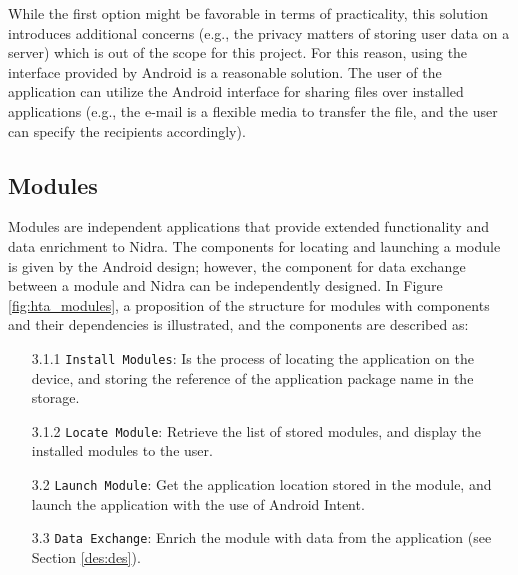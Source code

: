 While the first option might be favorable in terms of practicality, this solution introduces additional concerns (e.g., the privacy matters of storing user data on a server) which is out of the scope for this project. For this reason, using the interface provided by Android is a reasonable solution. The user of the application can utilize the Android interface for sharing files over installed applications (e.g., the e-mail is a flexible media to transfer the file, and the user can specify the recipients accordingly).  



\subsection{Modules}\label{soc:modules}

Modules are independent applications that provide extended functionality and data enrichment to Nidra. The components for locating and launching a module is given by the Android design; however, the component for data exchange between a module and Nidra can be independently designed.  In Figure \ref{fig:hta_modules}, a proposition of the structure for modules with components and their dependencies is illustrated, and the components are described as:

\begin{itemize}
    \item[3.1.1] \verb|Install Modules|: Is the process of locating the application on the device, and storing the reference of the application package name in the storage.  
    \item[3.1.2] \verb|Locate Module|: Retrieve the list of stored modules, and display the installed modules to the user. 
    \item[3.2] \verb|Launch Module|: Get the application location stored in the module, and launch the application with the use of Android Intent. 
    \item[3.3] \verb|Data Exchange|: Enrich the module with data from the application (see Section \ref{des:des}).
\end{itemize}


